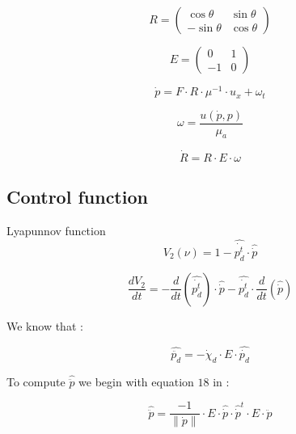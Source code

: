 \documentclass[conference]{IEEEtran}
\begin{document}
\begin{equation}
R=\begin{pmatrix}
\cos\theta & \sin\theta \\ -\sin\theta & \cos\theta 
\end{pmatrix}
\end{equation}

\begin{equation}
E=\begin{pmatrix}
0 & 1 \\
-1 & 0
\end{pmatrix}
\end{equation}

\begin{equation}
\dot{p}=F\cdot R \cdot \mu^{-1} \cdot u_{x} + \omega_{t}
\end{equation}\label{eq1}

\begin{equation}
\omega = \frac{u(\dot{p},p)}{\mu_{a}}
\end{equation}\label{eq2}

\begin{equation}
\dot{R}=R \cdot E \cdot \omega
\end{equation}\label{eq3}


\subsection{Control function}
Lyapunnov function
\begin{equation}
V_{2}( \nu)=1-\hat{\dot{p_{d}^{t}}}\cdot \hat{\dot{p}}
\end{equation}

\begin{equation}
\frac{dV_{2}}{dt}=-\frac{d}{dt}(\hat{\dot{p_{d}^{t}}})\cdot \hat{\dot{p}}-\hat{\dot{p_{d}^{t}}}\cdot \frac{d}{dt}(\hat{\dot{p}})
\end{equation}\label{eq4}

We know that \cite{b1}:

\begin{equation}
\hat{\ddot{p_{d}}}=-\dot{\chi}_{d}\cdot E \cdot \hat{\dot{p_{d}}}
\end{equation}\label{eq5}

To compute $\hat{\ddot{p}}$ we begin with equation $18$ in \cite{b1}:

\begin{equation}
\hat{\ddot{p}}=\frac{-1}{\lVert\dot{p}\rVert}\cdot E\cdot \hat{\dot{p}}\cdot \hat{\dot{p}}^{t}\cdot E \cdot \ddot{p}
\end{equation}\label{eq6}
\end{document}
